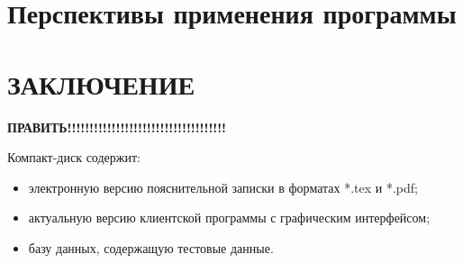 \newpage
\section{Перспективы применения программы}
\setcounter{figure}{0}


% 
% 
% 



\newpage
\section*{ЗАКЛЮЧЕНИЕ}
\textbf{ПРАВИТЬ!!!!!!!!!!!!!!!!!!!!!!!!!!!!!!!!!!!!}

\newpage
\renewcommand{\refname}{Список использованных источников}


Компакт-диск содержит: 
\begin{itemize}
\item электронную версию пояснительной записки в форматах *.tex и *.pdf;
\item актуальную версию клиентской программы с графическим интерфейсом;
\item базу данных, содержащую тестовые данные.
\end{itemize}


